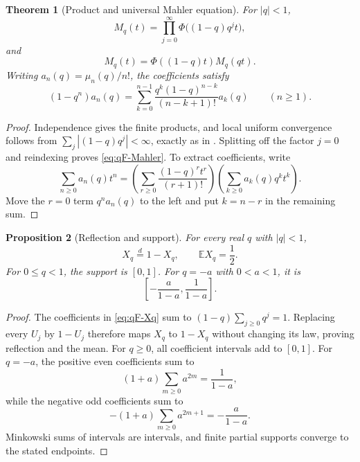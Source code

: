 \documentclass[11pt,oneside,openany]{book}
\newtheorem{theorem}{Theorem}[chapter]
\newtheorem{proposition}[theorem]{Proposition}
\theoremstyle{definition}
\theoremstyle{remark}
\newcommand{\Expect}{\mathbb E}
\begin{document}
\begin{theorem}[Product and universal Mahler equation]\label{thm:qF-Mahler}
For $|q|<1$,
\begin{equation}\label{eq:qF-product}
 \boxed{M_q(t)=\prod_{j=0}^{\infty}
 \Phi\bigl((1-q)q^jt\bigr),}
\end{equation}
and
\begin{equation}\label{eq:qF-Mahler}
 \boxed{M_q(t)=\Phi((1-q)t)M_q(qt).}
\end{equation}
Writing $a_n(q)=\mu_n(q)/n!$, the coefficients satisfy
\begin{equation}\label{eq:qF-moment-recurrence}
 (1-q^n)a_n(q)=
 \sum_{k=0}^{n-1}
 \frac{q^k(1-q)^{n-k}}{(n-k+1)!}a_k(q)
 \qquad(n\ge1).
\end{equation}
\end{theorem}

\begin{proof}
Independence gives the finite products, and local uniform convergence follows
from $\sum_j|(1-q)q^j|<\infty$, exactly as in
.  Splitting off the factor $j=0$ and
reindexing proves \eqref{eq:qF-Mahler}.  To extract coefficients, write
\[
 \sum_{n\ge0}a_n(q)t^n
 =\left(\sum_{r\ge0}\frac{(1-q)^rt^r}{(r+1)!}\right)
  \left(\sum_{k\ge0}a_k(q)q^kt^k\right).
\]
Move the $r=0$ term $q^na_n(q)$ to the left and put $k=n-r$ in the remaining
sum.
\end{proof}

\begin{proposition}[Reflection and support]\label{prop:qF-support}
For every real $q$ with $|q|<1$,
\begin{equation}\label{eq:qF-reflection}
 X_q\overset d=1-X_q,
 \qquad \Expect X_q=\frac12.
\end{equation}
For $0\le q<1$, the support is $[0,1]$.  For $q=-a$ with $0<a<1$, it is
\begin{equation}\label{eq:qF-negative-support}
 \left[-\frac a{1-a},\frac1{1-a}\right].
\end{equation}
\end{proposition}

\begin{proof}
The coefficients in \eqref{eq:qF-Xq} sum to
$(1-q)\sum_{j\ge0}q^j=1$.  Replacing every $U_j$ by $1-U_j$ therefore maps
$X_q$ to $1-X_q$ without changing its law, proving reflection and the mean.
For $q\ge0$, all coefficient intervals add to $[0,1]$.  For $q=-a$, the
positive even coefficients sum to
\[
 (1+a)\sum_{m\ge0}a^{2m}=\frac1{1-a},
\]
while the negative odd coefficients sum to
\[
 -(1+a)\sum_{m\ge0}a^{2m+1}=-\frac a{1-a}.
\]
Minkowski sums of intervals are intervals, and finite partial supports
converge to the stated endpoints.
\end{proof}
\end{document}
